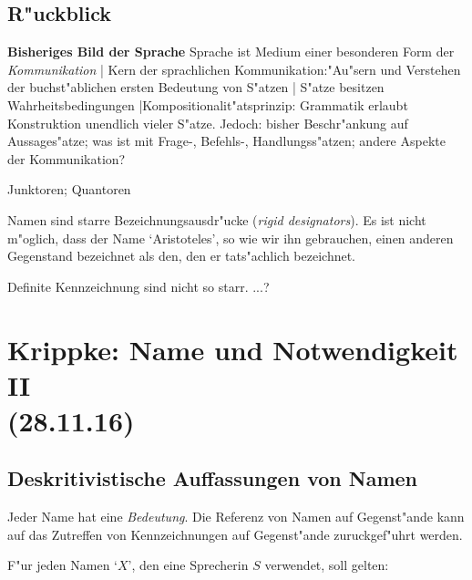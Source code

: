 \documentclass[emulatestandardclasses]{scrartcl}
\begin{document}
\subsection{R"uckblick}

\textbf{Bisheriges Bild der Sprache}
Sprache ist Medium einer besonderen Form der \emph{Kommunikation} | Kern der sprachlichen Kommunikation:"Au"sern und Verstehen der buchst"ablichen ersten Bedeutung von S"atzen | S"atze besitzen Wahrheitsbedingungen |Kompositionalit"atsprinzip: Grammatik erlaubt Konstruktion unendlich vieler S"atze. Jedoch: bisher Beschr"ankung auf Aussages"atze; was ist mit Frage-, Befehls-, Handlungss"atzen; andere Aspekte der Kommunikation?

\begin{description}[leftmargin=!,labelwidth=\widthof{\bfseries Definite Kennzeichnung}]
    \item[Ausdruckarten] Junktoren; Quantoren
    \item[a priori] 
    \item[a posteriori] 
    \item[kontingent] 
    \item[notwendig]
    \item[Name] Namen sind starre Bezeichnungsausdr"ucke (\emph{rigid designators}). Es ist nicht m"oglich, dass der Name `Aristoteles', so wie wir ihn gebrauchen, einen anderen Gegenstand bezeichnet als den, den er tats"achlich bezeichnet.
    \item[Definite Kennzeichnung] Definite Kennzeichnung sind nicht so starr. ...?
\end{description} 

\section{Krippke: Name und Notwendigkeit II\\(28.11.16)}

\subsection{Deskritivistische Auffassungen von Namen}  

Jeder Name hat eine \emph{Bedeutung}. Die Referenz von Namen auf Gegenst"ande kann auf das Zutreffen von Kennzeichnungen auf Gegenst"ande zuruckgef"uhrt werden.

F"ur jeden Namen `$X$', den eine Sprecherin $S$ verwendet, soll gelten:
\end{document}
